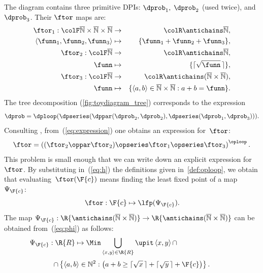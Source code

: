 \noindent The diagram contains three primitive DPIs: $\dprob_{1},$
$\dprob_{2}$ (used twice), and $\dprob_{3}$. Their $\ftor$ maps
are:
\begin{eqnarray*}
\ftor_{1}:{\colF\overline{\mathbb{N}}\times\overline{\mathbb{N}}\times\overline{\mathbb{N}}} & \rightarrow & {\colR\antichains\overline{\mathbb{N}}},\\
\left\langle \funn_{1},\funn_{2},\funn_{3}\right\rangle  & \mapsto & \{\funn_{1}+\funn_{2}+\funn_{3}\},\\
\ftor_{2}:{\colF\overline{\mathbb{N}}} & \rightarrow & {\colR\antichains\overline{\mathbb{N}}},\\
\funn& \mapsto & \{\lceil\sqrt{\funn}\,\rceil\},\\
\ftor_{3}:{\colF\overline{\mathbb{N}}} & \rightarrow & {\colR\antichains(\overline{\mathbb{N}}\times\overline{\mathbb{N}})},\\
\funn& \mapsto & \{\left\langle a,b\right\rangle \in\overline{\mathbb{N}}\times\overline{\mathbb{N}}:a+b=\funn\}.
\end{eqnarray*}
The tree decomposition (\cref{fig:toydiagram_tree}) corresponds to
the expression
\begin{equation}
\dprob=\dploop(\dpseries(\dppar(\dprob_{2},\dprob_{2}),\dpseries(\dprob_{1},\dprob_{3}))).\label{eq:expression}
\end{equation}
Consulting , from~(\ref{eq:expression})
one obtains an expression for~$\ftor$:
\begin{equation}
\ftor=\left((\ftor_{2}\oppar\ftor_{2})\opseries\ftor_{1}\opseries\ftor_{3}\right)^{\oploop}.\label{eq:h}
\end{equation}
This problem is small enough that we can write down an explicit expression
for~$\ftor$. By substituting in~(\ref{eq:h}) the definitions given
in~\textendash \ref{def:oploop}, we obtain that
evaluating~$\ftor(\F{c})$ means finding the least fixed point of
a map~$\Psi_{\F{c}}$:
\[
\ftor:\F{c}\mapsto\lfp(\Psi_{\F{c}}).
\]
The map $\Psi_{\F{c}}:\R{\antichains(\overline{\mathbb{N}}\times\overline{\mathbb{N}})}\rightarrow\R{\antichains(\overline{\mathbb{N}}\times\overline{\mathbb{N}})}$
can be obtained from~(\ref{eq:phi}) as follows:
\[
\Psi_{\F{c}}:\R{R}\mapsto\Min\bigcup_{\left\langle x,y\right\rangle \in\R{R}}\upit\left\langle x,y\right\rangle \cap\qquad\qquad\qquad\qquad
\]
\[
\cap\left\{ \left\langle a,b\right\rangle \in\mathbb{N}^{2}:\left(a+b\geq\lceil\sqrt{x}\,\rceil+\lceil\sqrt{y}\,\rceil+\F{c}\right)\right\} .
\]

